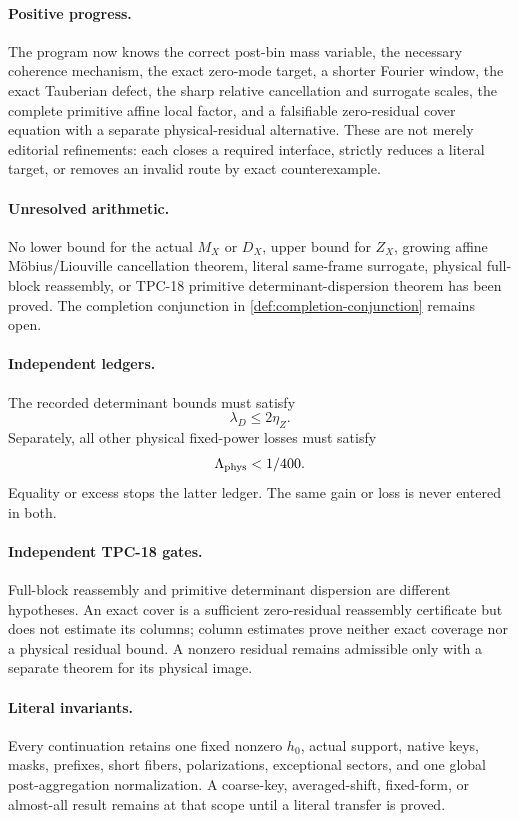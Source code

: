 \paragraph{Positive progress.}
The program now knows the correct post-bin mass variable, the
necessary coherence mechanism, the exact zero-mode target, a shorter
Fourier window, the exact Tauberian defect, the sharp relative
cancellation and surrogate scales, the complete primitive affine
local factor, and a falsifiable zero-residual cover equation with a
separate physical-residual alternative.  These are not merely
editorial refinements: each closes a required interface, strictly
reduces a literal target, or removes an invalid route by exact
counterexample.

\paragraph{Unresolved arithmetic.}
No lower bound for the actual \(M_X\) or \(D_X\), upper bound for
\(Z_X\), growing affine M\"obius/Liouville cancellation theorem,
literal same-frame surrogate, physical full-block reassembly, or TPC-18
primitive determinant-dispersion theorem has been proved.  The
completion conjunction in \cref{def:completion-conjunction} remains
open.

\paragraph{Independent ledgers.}
The recorded determinant bounds must satisfy
\[
 \lambda_D\le2\eta_Z.
\]
Separately, all other physical fixed-power losses must satisfy
\[
 \Lambda_{\rm phys}<1/400.
\]
Equality or excess stops the latter ledger.  The same gain or loss is
never entered in both.

\paragraph{Independent TPC-18 gates.}
Full-block reassembly and primitive determinant dispersion are
different hypotheses.  An exact cover is a sufficient zero-residual
reassembly certificate but does not estimate its columns; column
estimates prove neither exact coverage nor a physical residual bound.
A nonzero residual remains admissible only with a separate theorem for
its physical image.

\paragraph{Literal invariants.}
Every continuation retains one fixed nonzero \(h_0\), actual support,
native keys, masks, prefixes, short fibers, polarizations, exceptional
sectors, and one global post-aggregation normalization.  A coarse-key,
averaged-shift, fixed-form, or almost-all result remains at that scope
until a literal transfer is proved.

